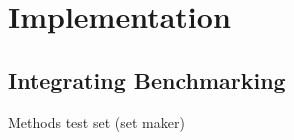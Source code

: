 %
\section{Implementation}
\label{sec_implementation}




\subsection{Integrating Benchmarking}
Methods
test set (set maker)